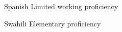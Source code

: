 

\begin{cvskills}

    \cvskill
    {Spanish} %
    {Limited working proficiency} %

    \cvskill
    {Swahili} %
    {Elementary proficiency} %

\end{cvskills}
